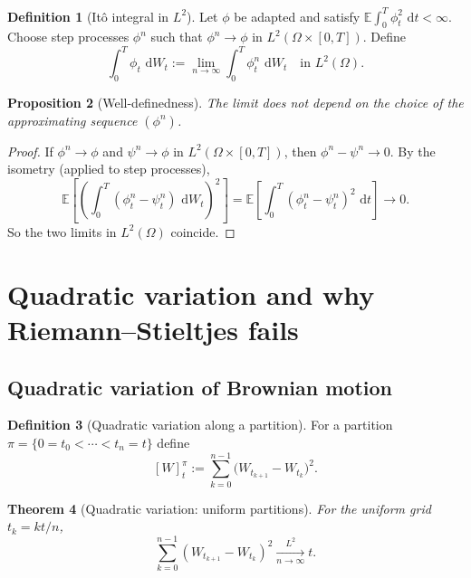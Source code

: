 \documentclass[11pt]{article}
\newcommand{\E}{\mathbb{E}}
\newcommand{\1}{\mathbf{1}}
\newcommand{\dd}{\,\mathrm{d}}
\numberwithin{equation}{section}
\theoremstyle{plain}
\newtheorem{theorem}{Theorem}[section]
\newtheorem{proposition}[theorem]{Proposition}
\theoremstyle{definition}
\newtheorem{definition}[theorem]{Definition}
\theoremstyle{remark}
\begin{document}
\begin{definition}[It\^o integral in $L^2$]
Let $\phi$ be adapted and satisfy $\E\int_0^T \phi_t^2\,\dd t<\infty$.
Choose step processes $\phi^n$ such that $\phi^n\to\phi$ in $L^2(\Omega\times[0,T])$.
Define
\[
\int_0^T \phi_t\,\dd W_t := \lim_{n\to\infty}\int_0^T \phi_t^n\,\dd W_t
\quad \text{in } L^2(\Omega).
\]
\end{definition}

\begin{proposition}[Well-definedness]
The limit does not depend on the choice of the approximating sequence $(\phi^n)$.
\end{proposition}

\begin{proof}
If $\phi^n\to\phi$ and $\psi^n\to\phi$ in $L^2(\Omega\times[0,T])$, then $\phi^n-\psi^n\to 0$.
By the isometry (applied to step processes),
\[
\E\!\left[\left(\int_0^T(\phi_t^n-\psi_t^n)\,\dd W_t\right)^2\right]
=\E\!\left[\int_0^T(\phi_t^n-\psi_t^n)^2\,\dd t\right]\to 0.
\]
So the two limits in $L^2(\Omega)$ coincide.
\end{proof}

\section{Quadratic variation and why Riemann--Stieltjes fails}

\subsection{Quadratic variation of Brownian motion}

\begin{definition}[Quadratic variation along a partition]
For a partition $\pi=\{0=t_0<\cdots<t_n=t\}$ define
\[
[W]_t^{\pi}:=\sum_{k=0}^{n-1}\big(W_{t_{k+1}}-W_{t_k}\big)^2.
\]
\end{definition}

\begin{theorem}[Quadratic variation: uniform partitions]
For the uniform grid $t_k=kt/n$,
\[
\sum_{k=0}^{n-1}(W_{t_{k+1}}-W_{t_k})^2 \xrightarrow[n\to\infty]{L^2} t.
\]
\end{theorem}
\end{document}
